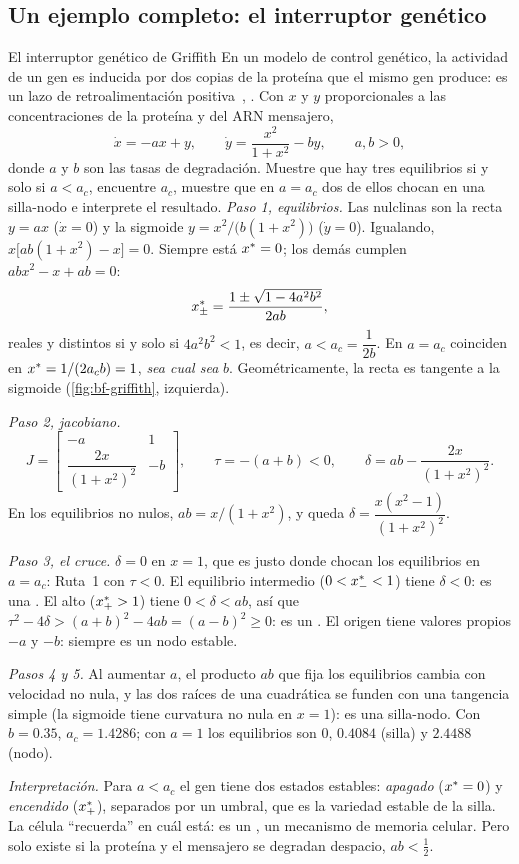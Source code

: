 \subsection{Un ejemplo completo: el interruptor genético}

\begin{ejemplo}[label=ej:bf-griffith]{El interruptor genético de Griffith}
En un modelo de control genético, la actividad de un gen es inducida por dos copias de la proteína que el mismo gen produce: es un lazo de retroalimentación positiva~\citep{Gri68}, \citep[Ejemplo~8.1.1]{Str15}. Con $x$ y $y$ proporcionales a las concentraciones de la proteína y del ARN mensajero,
\begin{equation}
  \dot x=-ax+y,\qquad \dot y=\frac{x^2}{1+x^2}-by ,\qquad a,b>0,
  \label{eq:bf-griffith}
\end{equation}
donde $a$ y $b$ son las tasas de degradación. Muestre que hay tres equilibrios si y solo si $a<a_c$, encuentre $a_c$, muestre que en $a=a_c$ dos de ellos chocan en una silla-nodo e interprete el resultado.
\solucion \emph{Paso 1, equilibrios.} Las nulclinas son la recta $y=ax$ ($\dot x=0$) y la sigmoide $y=x^2/\bigl(b(1+x^2)\bigr)$ ($\dot y=0$). Igualando, $x\bigl[ab(1+x^2)-x\bigr]=0$. Siempre está $x^{*}=0$; los demás cumplen $abx^2-x+ab=0$:
\[
  x^{*}_\pm=\frac{1\pm\sqrt{1-4a^2b^2}}{2ab} ,
\]
reales y distintos si y solo si $4a^2b^2<1$, es decir, $a<a_c=\dfrac1{2b}$. En $a=a_c$ coinciden en $x^{*}=1/(2a_cb)=1$, \emph{sea cual sea} $b$. Geométricamente, la recta es tangente a la sigmoide (\cref{fig:bf-griffith}, izquierda).

\emph{Paso 2, jacobiano.}
\[
  J=\begin{bmatrix}-a&1\\ \dfrac{2x}{(1+x^2)^2}&-b\end{bmatrix},\qquad \tau=-(a+b)<0,\qquad \delta=ab-\frac{2x}{(1+x^2)^2} .
\]
En los equilibrios no nulos, $ab=x/(1+x^2)$, y queda $\delta=\dfrac{x(x^2-1)}{(1+x^2)^2}$.

\emph{Paso 3, el cruce.} $\delta=0$ en $x=1$, que es justo donde chocan los equilibrios en $a=a_c$: Ruta~1 con $\tau<0$. El equilibrio intermedio ($0<x^{*}_-<1$) tiene $\delta<0$: es una . El alto ($x^{*}_+>1$) tiene $0<\delta<ab$, así que $\tau^2-4\delta>(a+b)^2-4ab=(a-b)^2\ge0$: es un . El origen tiene valores propios $-a$ y $-b$: siempre es un nodo estable.

\emph{Pasos 4 y 5.} Al aumentar $a$, el producto $ab$ que fija los equilibrios cambia con velocidad no nula, y las dos raíces de una cuadrática se funden con una tangencia simple (la sigmoide tiene curvatura no nula en $x=1$): es una silla-nodo. Con $b=0.35$, $a_c=1.4286$; con $a=1$ los equilibrios son $0$, $0.4084$ (silla) y $2.4488$ (nodo).

\emph{Interpretación.} Para $a<a_c$ el gen tiene dos estados estables: \emph{apagado} ($x^{*}=0$) y \emph{encendido} ($x^{*}_+$), separados por un umbral, que es la variedad estable de la silla. La célula ``recuerda'' en cuál está: es un , un mecanismo de memoria celular. Pero solo existe si la proteína y el mensajero se degradan despacio, $ab<\tfrac12$.
\end{ejemplo}

